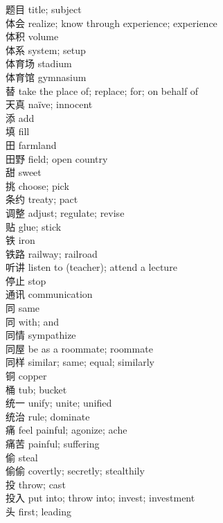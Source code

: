 题目 \quad title; subject\\
体会 \quad realize; know through experience; experience\\
体积 \quad volume\\
体系 \quad system; setup\\
体育场 \quad stadium\\
体育馆 \quad gymnasium\\
替 \quad take the place of; replace; for; on behalf of\\
天真 \quad naïve; innocent\\
添 \quad add\\
填 \quad fill\\
田 \quad farmland\\
田野 \quad field; open country\\
甜 \quad sweet\\
挑 \quad choose; pick\\
条约 \quad treaty; pact\\
调整 \quad adjust; regulate; revise\\
贴 \quad glue; stick\\
铁 \quad iron\\
铁路 \quad railway; railroad\\
听讲 \quad listen to (teacher); attend a lecture\\
停止 \quad stop\\
通讯 \quad communication\\
同 \quad same\\
同 \quad with; and\\
同情 \quad sympathize\\
同屋 \quad be as a roommate; roommate\\
同样 \quad similar; same; equal; similarly\\
铜 \quad copper\\
桶 \quad tub; bucket\\
统一 \quad unify; unite; unified\\
统治 \quad rule; dominate\\
痛 \quad feel painful; agonize; ache\\
痛苦 \quad painful; suffering\\
偷 \quad steal\\
偷偷 \quad covertly; secretly; stealthily\\
投 \quad throw; cast\\
投入 \quad put into; throw into; invest; investment\\
头 \quad first; leading\\
